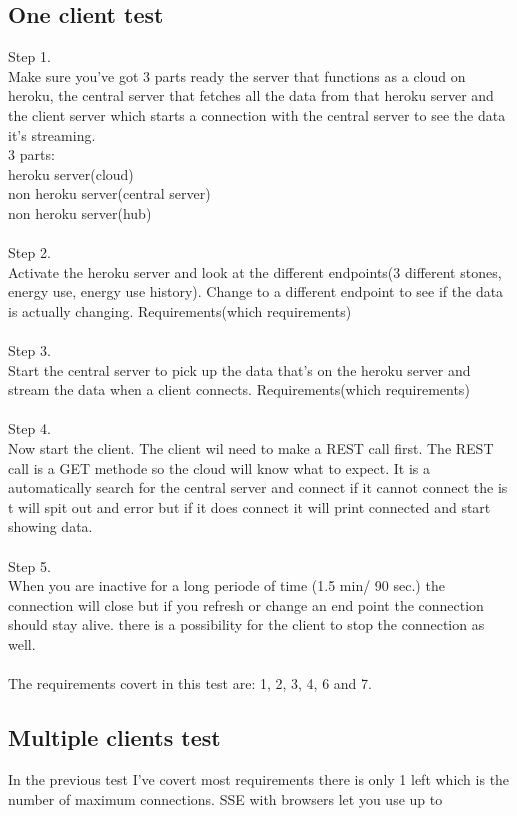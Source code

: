 \documentclass{article}
\begin{document}
\subsection{One client test}\label{client test}
Step 1. \\
Make sure you've got 3 parts ready the server that functions as a cloud on heroku, the central server that fetches all the data from that heroku server and the client server which starts a connection with the central server to see the data it's streaming. \\
3 parts: \\
heroku server(cloud)\\
non heroku server(central server)\\
non heroku server(hub)\\
\\
Step 2.\\
Activate the heroku server and look at the different endpoints(3 different stones, energy use, energy use history). Change to a different endpoint to see if the data is actually changing. Requirements(which requirements)\\
\\
Step 3.\\
Start the central server to pick up the data that's on the heroku server and stream the data when a client connects. Requirements(which requirements)\\
\\
Step 4. \\
Now start the client. The client wil need to make a REST call first. The REST call is a GET methode so the cloud will know what to expect. It is a automatically search for the central server and connect if it cannot connect the is t will spit out and error but if it does connect it will print connected and start showing data.\\
\\
Step 5. \\
When you are inactive for a long periode of time (1.5 min/ 90 sec.) the connection will close but if you refresh or change an end point the connection should stay alive. there is a possibility for the client to stop the connection as well. \\
\\
The requirements covert in this test are: 
1, 2, 3, 4, 6 and 7.
\subsection{Multiple clients test}\label{mclient}
In the previous test I've covert most requirements there is only 1 left which is the number of maximum connections. SSE with browsers let you use up to 
\end{document}
